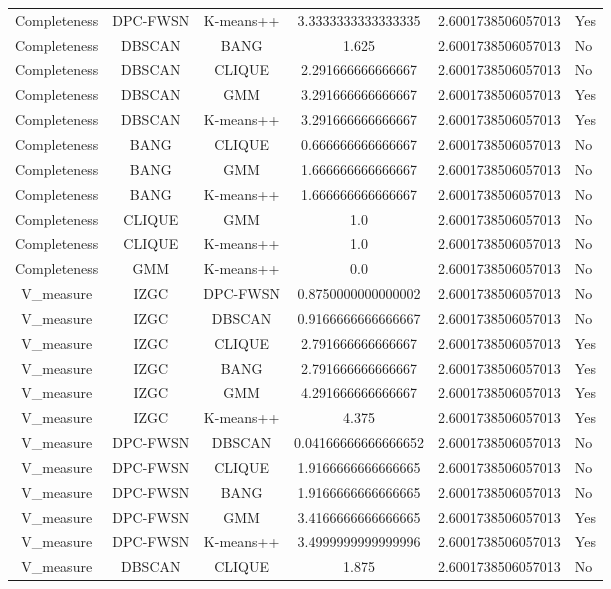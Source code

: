 \begin{table}[ht]
\begin{tabular}{cccc}
Completeness & DPC-FWSN & K-means++ & 3.3333333333333335 & 2.6001738506057013 & Yes\\
Completeness & DBSCAN & BANG & 1.625 & 2.6001738506057013 & No\\
Completeness & DBSCAN & CLIQUE & 2.291666666666667 & 2.6001738506057013 & No\\
Completeness & DBSCAN & GMM & 3.291666666666667 & 2.6001738506057013 & Yes\\
Completeness & DBSCAN & K-means++ & 3.291666666666667 & 2.6001738506057013 & Yes\\
Completeness & BANG & CLIQUE & 0.666666666666667 & 2.6001738506057013 & No\\
Completeness & BANG & GMM & 1.666666666666667 & 2.6001738506057013 & No\\
Completeness & BANG & K-means++ & 1.666666666666667 & 2.6001738506057013 & No\\
Completeness & CLIQUE & GMM & 1.0 & 2.6001738506057013 & No\\
Completeness & CLIQUE & K-means++ & 1.0 & 2.6001738506057013 & No\\
Completeness & GMM & K-means++ & 0.0 & 2.6001738506057013 & No\\
V_measure & IZGC & DPC-FWSN & 0.8750000000000002 & 2.6001738506057013 & No\\
V_measure & IZGC & DBSCAN & 0.9166666666666667 & 2.6001738506057013 & No\\
V_measure & IZGC & CLIQUE & 2.791666666666667 & 2.6001738506057013 & Yes\\
V_measure & IZGC & BANG & 2.791666666666667 & 2.6001738506057013 & Yes\\
V_measure & IZGC & GMM & 4.291666666666667 & 2.6001738506057013 & Yes\\
V_measure & IZGC & K-means++ & 4.375 & 2.6001738506057013 & Yes\\
V_measure & DPC-FWSN & DBSCAN & 0.04166666666666652 & 2.6001738506057013 & No\\
V_measure & DPC-FWSN & CLIQUE & 1.9166666666666665 & 2.6001738506057013 & No\\
V_measure & DPC-FWSN & BANG & 1.9166666666666665 & 2.6001738506057013 & No\\
V_measure & DPC-FWSN & GMM & 3.4166666666666665 & 2.6001738506057013 & Yes\\
V_measure & DPC-FWSN & K-means++ & 3.4999999999999996 & 2.6001738506057013 & Yes\\
V_measure & DBSCAN & CLIQUE & 1.875 & 2.6001738506057013 & No\\

\end{tabular}
\end{table}
